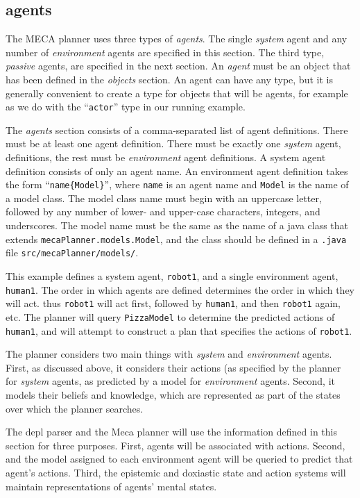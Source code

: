 \documentclass{article}
\begin{document}
\subsection{agents}

The MECA planner uses three types of \emph{agents}. The single
\emph{system} agent and any number of \emph{environment} agents are specified in
this section.  The third type, \emph{passive} agents, are specified in the next
section. 
An \emph{agent} must be an object that has been defined in the
\emph{objects} section. An agent can have any type, but it is generally
convenient to create a type for objects that will be agents, for example 
as we do with the ``\texttt{actor}'' type in our running example.

The \emph{agents} section consists of a comma-separated list of agent
definitions. There must be at least one agent definition. There must be exactly
one \emph{system} agent, definitions, the rest must be \emph{environment} agent
definitions. A system agent definition consists of only an agent name.
An environment
agent definition takes the form ``\texttt{name\{Model\}}'', where \texttt{name}
is an agent name and \texttt{Model} is the name of a model class. The model
class name must begin with an uppercase letter, followed by any number of
lower- and upper-case characters, integers, and underscores. The model name must
be the same as the name of a java class that extends
\texttt{mecaPlanner.models.Model}, and the class should be defined in a
\texttt{.java} file \texttt{src/mecaPlanner/models/}.

This example defines a system agent, \texttt{robot1}, and a single environment
agent, \texttt{human1}.
The order in which agents are defined determines the order in which they will
act. thus \texttt{robot1} will act first, followed by
\texttt{human1}, and then \texttt{robot1} again, etc. The planner will query
\texttt{PizzaModel} to determine the predicted actions of \texttt{human1}, and
will attempt to construct a plan that specifies the actions of \texttt{robot1}.

The planner considers two main things with \emph{system} and \emph{environment}
agents. First, as discussed above, it considers their actions (as specified by
the planner for \emph{system} agents, as predicted by a model for
\emph{environment} agents. Second, it models their beliefs and knowledge, which
are represented as part of the states over which the planner searches.

The depl parser and the Meca planner will use the information defined in this
section for three
purposes. First, agents will be associated with actions. Second, and the model
assigned to each environment agent will be queried to predict that agent's
actions. Third, the epistemic and doxiastic state and action
systems will maintain representations of agents' mental states.
\end{document}

